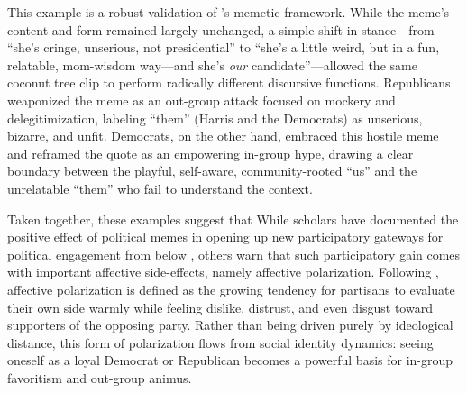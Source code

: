 \documentclass[12pt,twoside]{article}
\begin{document}
This example is a robust validation of \textcite{shifman2013memesdigitalculture}'s memetic framework.  While the meme's content and form remained largely unchanged,
a simple shift in stance---from ``she's cringe, unserious, not presidential'' to ``she's a little weird, but in a fun, relatable, mom-wisdom way—and she's \textit{our} candidate''---allowed the same coconut tree clip to perform radically different discursive functions. Republicans weaponized the meme as an out-group attack focused on mockery and delegitimization, labeling ``them'' (Harris and the Democrats) as unserious, bizarre, and unfit. Democrats, on the other hand, embraced this hostile meme and reframed the quote as an empowering in-group hype, drawing a clear boundary between the playful, self-aware, community-rooted ``us'' and the unrelatable ``them'' who fail to understand the context. 


Taken together, these examples suggest that  While scholars have documented the positive effect of political memes in opening up new participatory gateways for political engagement from below \parencite{sreekumar2013onlinepoliticalmemes, ahmed2024breakingbarriersmemes, mushtaq2025betweenhumorharm}, others warn that such participatory gain comes with important affective side-effects, namely affective polarization. Following \textcite{iyengar2012affectnotideology,iyengar2015fearloathing,iyengar2019originsaffectivepolarization}, affective polarization is defined as the growing tendency for partisans to evaluate their own side warmly while feeling dislike, distrust, and even disgust toward supporters of the opposing party. Rather than being driven purely by ideological distance, this form of polarization flows from social identity dynamics: seeing oneself as a loyal Democrat or Republican becomes a powerful basis for in-group favoritism and out-group animus.  
\end{document}
